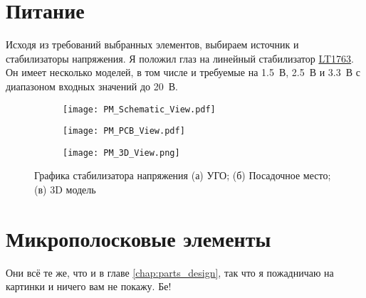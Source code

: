 \section{Питание}

Исходя из требований выбранных элементов, выбираем источник и стабилизаторы напряжения. Я положил глаз на линейный стабилизатор \href{https://www.analog.com/ru/products/lt1763.html}{LT1763}. Он имеет несколько моделей, в том числе и требуемые на 1.5~В, 2.5~В и 3.3~В с диапазоном входных значений до 20~В.

\begin{figure}[H]
	\centering
	\begin{subfigure}[b]{0.45\textwidth}
		\centering
		\texttt{[image: PM\_Schematic\_View.pdf]}
		\caption{}%
		\label{fig:PM_Schematic_View}
	\end{subfigure}
	\hfill
	\begin{subfigure}[b]{0.45\textwidth}
		\centering
		\texttt{[image: PM\_PCB\_View.pdf]}
		\caption{}%
		\label{fig:PM_PCB_View}
	\end{subfigure}
	\hfill
	\begin{subfigure}[b]{0.5\textwidth}
		\centering
		\texttt{[image: PM\_3D\_View.png]}
		\caption{}%
		\label{fig:PM_3D_View}
	\end{subfigure}
	\caption{%
		Графика стабилизатора напряжения
		(а) УГО;
		(б) Посадочное место;
		(в) 3D модель
	}%
	\label{fig:PM_footprint}
\end{figure}

\section*{Микрополосковые элементы}

Они всё те же, что и в главе \ref{chap:parts_design}, так что я пожадничаю на картинки и ничего вам не покажу. Бе!

